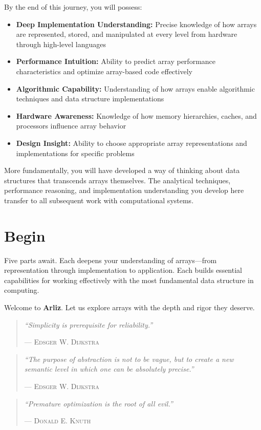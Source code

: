 By the end of this journey, you will possess:

\begin{itemize}
    \item \textbf{Deep Implementation Understanding:} Precise knowledge of how arrays are represented, stored, and manipulated at every level from hardware through high-level languages
    
    \item \textbf{Performance Intuition:} Ability to predict array performance characteristics and optimize array-based code effectively
    
    \item \textbf{Algorithmic Capability:} Understanding of how arrays enable algorithmic techniques and data structure implementations
    
    \item \textbf{Hardware Awareness:} Knowledge of how memory hierarchies, caches, and processors influence array behavior
    
    \item \textbf{Design Insight:} Ability to choose appropriate array representations and implementations for specific problems
\end{itemize}

More fundamentally, you will have developed a way of thinking about data structures that transcends arrays themselves. The analytical techniques, performance reasoning, and implementation understanding you develop here transfer to all subsequent work with computational systems.

\section*{Begin}

Five parts await. Each deepens your understanding of arrays—from representation through implementation to application. Each builds essential capabilities for working effectively with the most fundamental data structure in computing.

Welcome to \textbf{Arliz}. Let us explore arrays with the depth and rigor they deserve.

\vfill

\begin{quote}
\textit{``Simplicity is prerequisite for reliability.''}

\hfill--- \textsc{Edsger W. Dijkstra}
\end{quote}

\begin{quote}
\textit{``The purpose of abstraction is not to be vague, but to create a new semantic level in which one can be absolutely precise.''}

\hfill--- \textsc{Edsger W. Dijkstra}
\end{quote}

\begin{quote}
\textit{``Premature optimization is the root of all evil.''}

\hfill--- \textsc{Donald E. Knuth}
\end{quote}

\clearpage